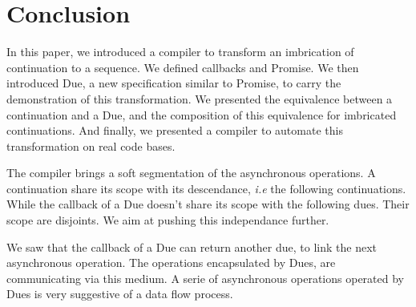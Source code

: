 \section{Conclusion}

In this paper, we introduced a compiler to transform an imbrication of continuation to a sequence.
We defined callbacks and Promise.
We then introduced Due, a new specification similar to Promise, to carry the demonstration of this transformation.
We presented the equivalence between a continuation and a Due, and the composition of this equivalence for imbricated continuations.
And finally, we presented a compiler to automate this transformation on real code bases.

The compiler brings a soft segmentation of the asynchronous operations.
A continuation share its scope with its descendance, \textit{i.e} the following continuations.
While the callback of a Due doesn't share its scope with the following dues.
Their scope are disjoints.
We aim at pushing this independance further.

We saw that the callback of a Due can return another due, to link the next asynchronous operation.
The operations encapsulated by Dues, are communicating via this medium. 
A serie of asynchronous operations operated by Dues is very suggestive of a data flow process.